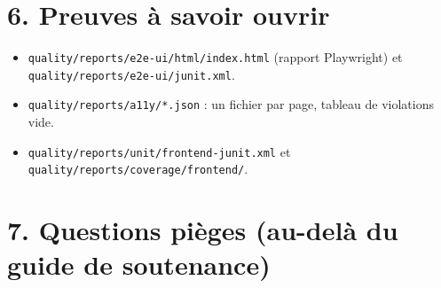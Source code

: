 \documentclass[
  11pt,
]{article}
\providecommand{\tightlist}{%
  \setlength{\itemsep}{0pt}\setlength{\parskip}{0pt}}
\begin{document}
\section{6. Preuves à savoir ouvrir}\label{6-preuves-uxe0-savoir-ouvrir}

\begin{itemize}
\tightlist
\item
  \texttt{quality/}\allowbreak{}\texttt{reports/}\allowbreak{}\texttt{e2e-}\allowbreak{}\texttt{ui/}\allowbreak{}\texttt{html/}\allowbreak{}\texttt{index.}\allowbreak{}\texttt{html}
  (rapport Playwright) et
  \texttt{quality/}\allowbreak{}\texttt{reports/}\allowbreak{}\texttt{e2e-}\allowbreak{}\texttt{ui/}\allowbreak{}\texttt{junit.}\allowbreak{}\texttt{xml}.
\item
  \texttt{quality/}\allowbreak{}\texttt{reports/}\allowbreak{}\texttt{a11y/}\allowbreak{}\texttt{*.}\allowbreak{}\texttt{json}
  : un fichier par page, tableau de violations vide.
\item
  \texttt{quality/}\allowbreak{}\texttt{reports/}\allowbreak{}\texttt{unit/}\allowbreak{}\texttt{frontend-}\allowbreak{}\texttt{junit.}\allowbreak{}\texttt{xml}
  et
  \texttt{quality/}\allowbreak{}\texttt{reports/}\allowbreak{}\texttt{coverage/}\allowbreak{}\texttt{frontend/}\allowbreak{}.
\end{itemize}

\section{7. Questions pièges (au-delà du guide de
soutenance)}\label{7-questions-piuxe8ges-au-deluxe0-du-guide-de-soutenance}
\end{document}
